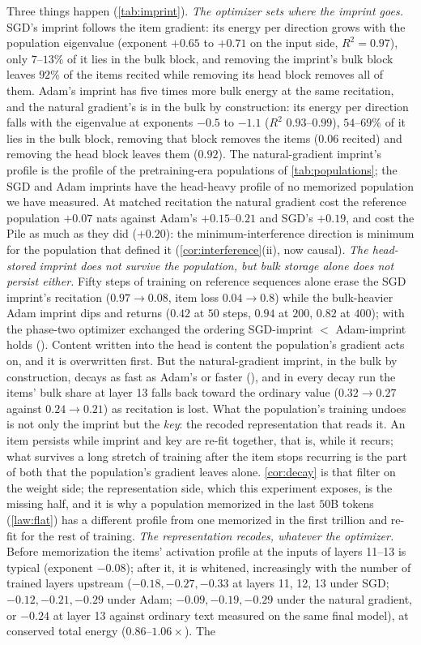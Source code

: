 \documentclass{article}
\theoremstyle{definition}\newtheorem{law}{Empirical law}
\begin{document}
Three things happen (\cref{tab:imprint}). \emph{The optimizer sets where the imprint goes.} SGD's imprint follows the item gradient: its energy per direction grows with the population eigenvalue (exponent $+0.65$ to $+0.71$ on the input side, $R^2=0.97$), only $7$--$13\%$ of it lies in the bulk block, and removing the imprint's bulk block leaves $92\%$ of the items recited while removing its head block removes all of them. Adam's imprint has five times more bulk energy at the same recitation, and the natural gradient's is in the bulk by construction: its energy per direction falls with the eigenvalue at exponents $-0.5$ to $-1.1$ ($R^2$ $0.93$--$0.99$), $54$--$69\%$ of it lies in the bulk block, removing that block removes the items ($0.06$ recited) and removing the head block leaves them ($0.92$). The natural-gradient imprint's profile is the profile of the pretraining-era populations of \cref{tab:populations}; the SGD and Adam imprints have the head-heavy profile of no memorized population we have measured. At matched recitation the natural gradient cost the reference population $+0.07$ nats against Adam's $+0.15$--$0.21$ and SGD's $+0.19$, and cost the Pile as much as they did ($+0.20$): the minimum-interference direction is minimum for the population that defined it (\cref{cor:interference}(ii), now causal). \emph{The head-stored imprint does not survive the population, but bulk storage alone does not persist either.} Fifty steps of training on reference sequences alone erase the SGD imprint's recitation ($0.97\to0.08$, item loss $0.04\to0.8$) while the bulk-heavier Adam imprint dips and returns ($0.42$ at $50$ steps, $0.94$ at $200$, $0.82$ at $400$); with the phase-two optimizer exchanged the ordering SGD-imprint $<$ Adam-imprint holds (\crossDecay). Content written into the head is content the population's gradient acts on, and it is overwritten first. But the natural-gradient imprint, in the bulk by construction, decays as fast as Adam's or faster (\ngDecay), and in every decay run the items' bulk share at layer 13 falls back toward the ordinary value ($0.32\to0.27$ against $0.24\to0.21$) as recitation is lost. What the population's training undoes is not only the imprint but the \emph{key}: the recoded representation that reads it. An item persists while imprint and key are re-fit together, that is, while it recurs; what survives a long stretch of training after the item stops recurring is the part of both that the population's gradient leaves alone. \cref{cor:decay} is that filter on the weight side; the representation side, which this experiment exposes, is the missing half, and it is why a population memorized in the last $50$B tokens (\cref{law:flat}) has a different profile from one memorized in the first trillion and re-fit for the rest of training. \emph{The representation recodes, whatever the optimizer.} Before memorization the items' activation profile at the inputs of layers 11--13 is typical (exponent $-0.08$); after it, it is whitened, increasingly with the number of trained layers upstream ($-0.18,-0.27,-0.33$ at layers 11, 12, 13 under SGD; $-0.12,-0.21,-0.29$ under Adam; $-0.09,-0.19,-0.29$ under the natural gradient, or $-0.24$ at layer 13 against ordinary text measured on the same final model), at conserved total energy ($0.86$--$1.06\times$). The 
\end{document}
